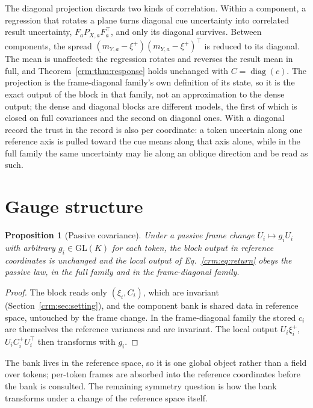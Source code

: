 \documentclass[11pt]{article}
\newtheorem{proposition}[theorem]{Proposition}
\theoremstyle{definition}
\theoremstyle{remark}
\providecommand{\GL}{\mathrm{GL}}
\newcommand{\diag}{\operatorname{diag}}
\begin{document}
The diagonal projection discards two kinds of correlation. Within a component, a regression that rotates a plane turns diagonal cue uncertainty into correlated result uncertainty, $F_aP_{X,a}F_a^\top$, and only its diagonal survives. Between components, the spread $(m_{Y,a}-\xi^+)(m_{Y,a}-\xi^+)^\top$ is reduced to its diagonal. The mean is unaffected: the regression rotates and reverses the result mean in full, and Theorem~\ref{crm:thm:response} holds unchanged with $C=\diag(c)$. The projection is the frame-diagonal family's own definition of its state, so it is the exact output of the block in that family, not an approximation to the dense output; the dense and diagonal blocks are different models, the first of which is closed on full covariances and the second on diagonal ones. With a diagonal record the trust in the record is also per coordinate: a token uncertain along one reference axis is pulled toward the cue means along that axis alone, while in the full family the same uncertainty may lie along an oblique direction and be read as such.

\section{Gauge structure}
\label{crm:sec:gauge}

\begin{proposition}[Passive covariance]
\label{crm:prop:passive}
Under a passive frame change $U_i\mapsto g_iU_i$ with arbitrary $g_i\in\GL(K)$ for each token, the block output in reference coordinates is unchanged and the local output of Eq.~\eqref{crm:eq:return} obeys the passive law, in the full family and in the frame-diagonal family.
\end{proposition}

\begin{proof}
The block reads only $(\xi_i,C_i)$, which are invariant (Section~\ref{crm:sec:setting}), and the component bank is shared data in reference space, untouched by the frame change. In the frame-diagonal family the stored $c_i$ are themselves the reference variances and are invariant. The local output $U_i\xi_i^+$, $U_iC_i^+U_i^\top$ then transforms with $g_i$.
\end{proof}

The bank lives in the reference space, so it is one global object rather than a field over tokens; per-token frames are absorbed into the reference coordinates before the bank is consulted. The remaining symmetry question is how the bank transforms under a change of the reference space itself.
\end{document}
